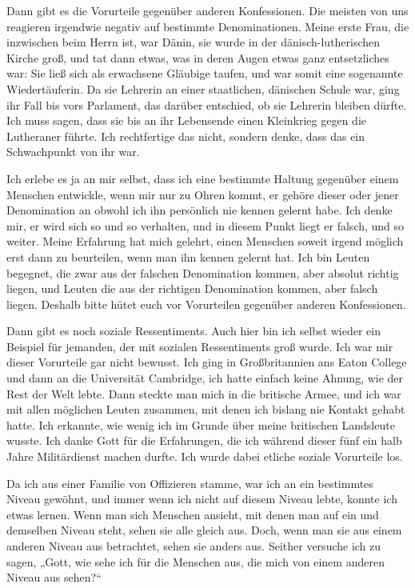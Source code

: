 Dann gibt es die Vorurteile gegenüber anderen Konfessionen.
Die meisten von uns reagieren irgendwie negativ auf bestimmte Denominationen.
Meine erste Frau, die inzwischen beim Herrn ist, war Dänin, sie wurde in der dänisch-lutherischen Kirche groß, und tat dann etwas, was in deren Augen etwas ganz entsetzliches war: Sie ließ sich als erwachsene Gläubige taufen, und war somit eine sogenannte Wiedertäuferin.
Da sie Lehrerin an einer staatlichen, dänischen Schule war, ging ihr Fall bis vors Parlament, das darüber entschied, ob sie Lehrerin bleiben dürfte.
Ich muss sagen, dass sie bis an ihr Lebensende einen Kleinkrieg gegen die Lutheraner führte.
Ich rechtfertige das nicht, sondern denke, dass das ein Schwachpunkt von ihr war.

Ich erlebe es ja an mir selbst, dass ich eine bestimmte Haltung gegenüber einem Menschen entwickle, wenn mir nur zu Ohren kommt, er gehöre dieser oder jener Denomination an obwohl ich ihn persönlich nie kennen gelernt habe.
Ich denke mir, er wird sich so und so verhalten, und in diesem Punkt liegt er falsch, und so weiter.
Meine Erfahrung hat mich gelehrt, einen Menschen soweit irgend möglich erst dann zu beurteilen, wenn man ihn kennen gelernt hat.
Ich bin Leuten begegnet, die zwar aus der falschen Denomination kommen, aber absolut richtig liegen, und Leuten die aus der richtigen Denomination kommen, aber falsch liegen. Deshalb bitte hütet euch vor Vorurteilen gegenüber anderen Konfessionen.

Dann gibt es noch soziale Ressentiments.
Auch hier bin ich selbst wieder ein Beispiel für jemanden, der mit sozialen Ressentiments groß wurde.
Ich war mir dieser Vorurteile gar nicht bewusst.
Ich ging in Großbritannien ans Eaton College und dann an die Universität Cambridge, ich hatte einfach keine Ahnung, wie der Rest der Welt lebte.
Dann steckte man mich in die britische Armee, und ich war mit allen möglichen Leuten zusammen, mit denen ich bislang nie Kontakt gehabt hatte.
Ich erkannte, wie wenig ich im Grunde über meine britischen Landsleute wusste. Ich danke Gott für die Erfahrungen, die ich während dieser fünf ein halb Jahre Militärdienst machen durfte.
Ich wurde dabei etliche soziale Vorurteile los.

Da ich aus einer Familie von Offizieren stamme, war ich an ein bestimmtes Niveau gewöhnt, und immer wenn ich nicht auf diesem Niveau lebte, konnte ich etwas lernen. 
Wenn man sich Menschen ansieht, mit denen man auf ein und demselben Niveau steht, sehen sie alle gleich aus. 
Doch, wenn man sie aus einem anderen Niveau aus betrachtet, sehen sie anders aus. 
Seither versuche ich zu sagen, „Gott, wie sehe ich für die Menschen aus, die mich von einem anderen Niveau aus sehen?“

